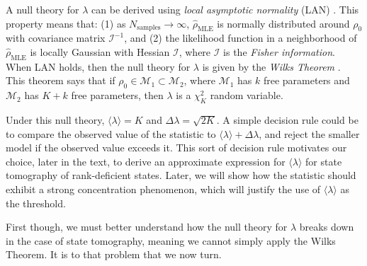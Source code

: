 \documentclass[aps,pra, twocolumn]{revtex4-1}
\newcommand{\M}{\mathcal{M}}
\newcommand{\Fi}{\mathcal{I}}
\newcommand{\rhohat}{\hat{\rho}}
\newcommand{\rhoMLE}{\rhohat_{\scriptscriptstyle\mathrm{MLE}}}
\begin{document}
A null theory for $\lambda$ can be derived using \emph{local asymptotic normality} (LAN) \cite{LeCam1970, LeCam1956} . This property means that: (1) as $N_{\mathrm{samples}}\rightarrow \infty$,  $\rhoMLE$ is normally distributed around $\rho_{0}$ with covariance matrix $\Fi^{-1}$, and (2) the likelihood function in a neighborhood of $\rhoMLE$ is locally Gaussian with Hessian $\Fi$, where $\Fi$ is the \emph{Fisher information}. When LAN holds, then the null theory for $\lambda$ is given by the \emph{Wilks Theorem} \cite{Wilks1938}. This theorem says that if $\rho_{0}\in \M_{1}\subset \M_{2}$, where $\M_{1}$ has $k$ free parameters and $\M_{2}$ has $K+k$ free parameters, then $ \lambda$ is a $\chi^{2}_{K}$ random variable. 

Under this null theory, $\langle \lambda \rangle = K$ and $\Delta \lambda = \sqrt{2K}$. A simple decision rule could be to compare the observed value of the statistic to $\langle \lambda \rangle + \Delta \lambda$, and reject the smaller model if the observed value exceeds it. This sort of decision rule motivates our choice, later in the text, to derive an approximate expression for $\langle \lambda \rangle$ for state tomography of rank-deficient states. Later, we will show how the statistic should exhibit a strong concentration phenomenon, which will justify the use of $\langle \lambda \rangle$ as the threshold.

First though, we must better understand how the null theory for $\lambda$ breaks down in the case of state tomography, meaning we cannot simply apply the Wilks Theorem. It is to that problem that we now turn.
\end{document}
